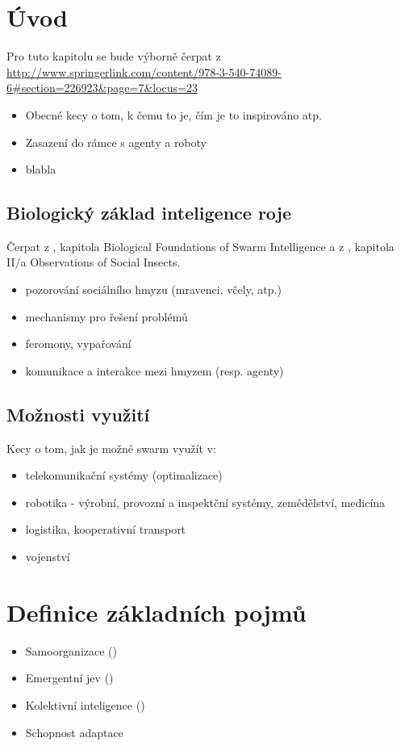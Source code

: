 \documentclass[a4paper,12pt]{article}
\let\stdsection\section
\renewcommand\section{\newpage\stdsection}
\begin{document}


\tableofcontents

\section{Úvod}
Pro tuto kapitolu se bude výborně čerpat z \cite{Blum08SwarmInt} \\
\url{http://www.springerlink.com/content/978-3-540-74089-6#section=226923&page=7&locus=23}

\begin{itemize}
  \item Obecné kecy o tom, k čemu to je, čím je to inspirováno atp.
  \item Zasazení do rámce s agenty a roboty
  \item blabla
\end{itemize}

\subsection{Biologický základ inteligence roje}
Čerpat z \cite{Blum08SwarmInt}, kapitola Biological Foundations of Swarm Intelligence
a z \cite{fleischer2005}, kapitola II/a Observations of Social Insects.
\begin{itemize}
  \item pozorování sociálního hmyzu (mravenci, včely, atp.)
  \item mechanismy pro řešení problémů
  \item feromony, vypařování
  \item komunikace a interakce mezi hmyzem (resp. agenty)
\end{itemize}


\subsection{Možnosti využití}
Kecy o tom, jak je možné swarm využít v:
\begin{itemize}
  \item telekomunikační systémy (optimalizace)
  \item robotika - výrobní, provozní a inspektční systémy, zemědělství, medicína
  \item logistika, kooperativní transport
  \item vojenství
\end{itemize}



\section{Definice základních pojmů}
\begin{itemize}
  \item Samoorganizace (\cite{fleischer2005})
  \item Emergentní jev (\cite{fleischer2005})
  \item Kolektivní inteligence (\cite{fleischer2005})
  \item Schopnost adaptace
\end{itemize}
\end{document}
